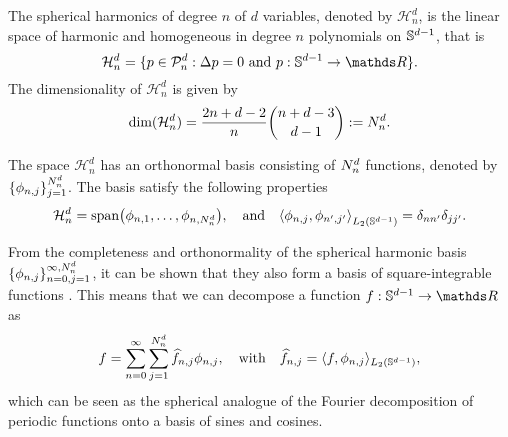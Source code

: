 \begin{definition}
    The spherical harmonics of degree $n$ of $d$ variables, denoted by $\mathcal{H}_{n}^d$, is the linear space of harmonic and homogeneous in degree $n$ polynomials on $\mathbb{S}^{d-1}$, that is 
    \begin{equation}
        \mathcal{H}_{n}^d = \{p \in \mathcal{P}_n^d: \Delta p = 0\ \text{and}\ p: \dsphere \rightarrow \Reals \}.
    \end{equation}
The dimensionality of $ \mathcal{H}_{n}^d$ is given by
\begin{equation}
\label{eq:numharmonics}
\textrm{dim}(\mathcal{H}_{n}^d) = \frac{2 n + d - 2}{n} \binom{n + d - 3}{d - 1} := N^d_n.
\end{equation}
\end{definition}

The space $\mathcal{H}_{n}^d$ has an orthonormal basis consisting of $N^d_n$ functions, denoted by $\{\phi_{n,j}\}_{j=1}^{N^d_n}$. The basis satisfy the following properties
\begin{equation}
    \mathcal{H}_{n}^d  = \textrm{span}\left(\phi_{n,1}, \ldots, \phi_{n, \dnumharmonicsforlevel}\right),\quad\text{and}\quad\left\langle \phi_{n, j}, \phi_{n', j'}\right\rangle_{L_2(\dsphere)} = \delta_{n n'} \delta_{j j'}.
\end{equation}

From the completeness and orthonormality of the spherical harmonic basis $\{\phi_{n,j}\}_{n=0,j=1}^{\infty,N^d_n}$, it can be shown that they also form a basis of square-integrable functions \citep{frye2014}. This means that we can decompose a function $f: \dsphere \rightarrow \Reals$ as
\begin{equation}
    f = \sum_{n=0}^{\infty} \sum_{j=1}^{N^d_n} \widehat{f}_{n, j} \phi_{n, j},\quad\text{with}\quad\widehat{f}_{n, j} = \langle f, \phi_{n, j} \rangle_{L_2(\mathbb{S}^{d-1})},
\end{equation}
which can be seen as the spherical analogue of the Fourier decomposition of periodic functions onto a basis of sines and cosines.

